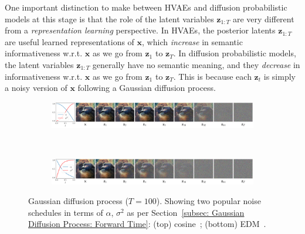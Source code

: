 One important distinction to make between HVAEs and diffusion probabilistic models at this stage is that the role of the latent variables $\mathbf{z}_{1:T}$ are very different from a \textit{representation learning} perspective. In HVAEs, the posterior latents $\mathbf{z}_{1:T}$ are useful learned representations of $\mathbf{x}$, which \textit{increase} in semantic informativeness w.r.t. $\mathbf{x}$ as we go from $\mathbf{z}_1$ to $\mathbf{z}_T$. In diffusion probabilistic models, the latent variables $\mathbf{z}_{1:T}$ generally have no semantic meaning, and they \textit{decrease} in informativeness w.r.t. $\mathbf{x}$ as we go from $\mathbf{z}_1$ to $\mathbf{z}_T$. This is because each $\mathbf{z}_t$ is simply a noisy version of $\mathbf{x}$ following a Gaussian diffusion process.
%
\newpage
%
\begin{figure}[!t]
    \begin{subfigure}{\textwidth}
        \centering 
        \includegraphics[trim=0 0 0 0,clip,width=\textwidth]{figures/cosine_sloth.pdf}
        \label{fig:cosine_sloth}
    \end{subfigure}
    \\[-8pt]
    \begin{subfigure}{\textwidth}
        \centering \includegraphics[trim=0 0 0 0,clip,width=\textwidth]{figures/edm_sloth.pdf}
        \label{fig:edm_sloth}
    \end{subfigure}
    \vspace{-20pt}
    \caption{Gaussian diffusion process ($T{=}100$). Showing two popular noise schedules in terms of $\alpha$, $\sigma^2$ as per Section~\ref{subsec: Gaussian Diffusion Process: Forward Time}: (top) cosine~\citep{nichol2021improved}; (bottom) EDM~\citep{karras2022elucidating}.}
    \label{fig: diff_sloth}
\end{figure}
%
